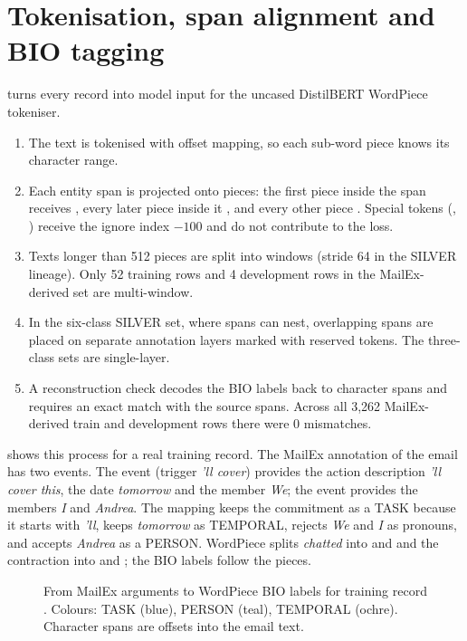 \section{Tokenisation, span alignment and BIO tagging}
\label{sec:bio}
 turns every record into model input for the uncased DistilBERT WordPiece tokeniser.
\begin{enumerate}
  \item The text is tokenised with offset mapping, so each sub-word piece knows its character range.
  \item Each entity span is projected onto pieces: the first piece inside the span receives , every later piece inside it , and every other piece . Special tokens (\code{[CLS]}, \code{[SEP]}) receive the ignore index $-100$ and do not contribute to the loss.
  \item Texts longer than 512 pieces are split into windows (stride 64 in the SILVER lineage). Only 52 training rows and 4 development rows in the MailEx-derived set are multi-window.
  \item In the six-class SILVER set, where spans can nest, overlapping spans are placed on separate annotation layers marked with reserved \code{[unusedN]} tokens. The three-class sets are single-layer.
  \item A reconstruction check decodes the BIO labels back to character spans and requires an exact match with the source spans. Across all 3,262 MailEx-derived train and development rows there were 0 mismatches.
\end{enumerate}

 shows this process for a real training record. The MailEx annotation of the email has two events. The  event (trigger \emph{'ll cover}) provides the action description \emph{'ll cover this}, the date \emph{tomorrow} and the member \emph{We}; the  event provides the members \emph{I} and \emph{Andrea}. The mapping keeps the commitment as a TASK because it starts with \emph{'ll}, keeps \emph{tomorrow} as TEMPORAL, rejects \emph{We} and \emph{I} as pronouns, and accepts \emph{Andrea} as a PERSON. WordPiece splits \emph{chatted} into  and  and the contraction into  and ; the BIO labels follow the pieces.

\begin{figure}[t]
\centering
{}
\caption[BIO tagging of an annotated email]{From MailEx arguments to WordPiece BIO labels for training record . Colours: TASK (blue), PERSON (teal), TEMPORAL (ochre). Character spans are offsets into the email text.}
\label{fig:bio}
\end{figure}

